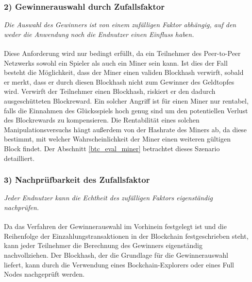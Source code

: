 \subsubsection{2) Gewinnerauswahl durch Zufallsfaktor}
\textit{Die Auswahl des Gewinners ist von einem zufälligen Faktor abhängig, auf den weder die Anwendung noch die Endnutzer einen Einfluss haben.}\\\\
Diese Anforderung wird nur bedingt erfüllt, da ein Teilnehmer des Peer-to-Peer Netzwerks sowohl ein Spieler als auch ein Miner sein kann. Ist dies der Fall besteht die Möglichkeit, dass der Miner einen validen Blockhash verwirft, sobald er merkt, dass er durch diesen Blockhash nicht zum Gewinner des Geldtopfes wird. Verwirft der Teilnehmer einen Blockhash, riskiert er den dadurch ausgeschütteten Blockreward. Ein solcher Angriff ist für einen Miner nur rentabel, falls die Einnahmen des Glücksspiels hoch genug sind um den potentiellen Verlust des Blockrewards zu kompensieren. Die Rentabilität eines solchen Manipulationsversuchs hängt außerdem von der Hashrate des Miners ab, da diese bestimmt, mit welcher Wahrscheinlichkeit der Miner einen weiteren gültigen Block findet. Der Abschnitt \ref{btc_eval_miner} betrachtet dieses Szenario detailliert. %

\subsubsection{3) Nachprüfbarkeit des Zufallsfaktor}
\textit{Jeder Endnutzer kann die Echtheit des zufälligen Faktors eigenständig nachprüfen.}\\\\
Da das Verfahren der Gewinnerauswahl im Vorhinein festgelegt ist und die Reihenfolge der Einzahlungstransaktionen in der Blockchain festgeschrieben steht, kann jeder Teilnehmer die Berechnung des Gewinners eigenständig nachvollziehen. Der Blockhash, der die Grundlage für die Gewinnerauswahl liefert, kann durch die Verwendung eines Bockchain-Explorers oder eines Full Nodes nachgeprüft werden. 

